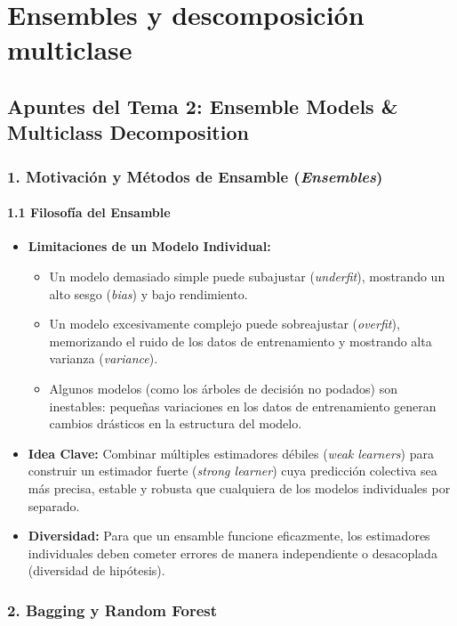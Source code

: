 \chapter{Ensembles y descomposición multiclase}
\section{Apuntes del Tema 2: Ensemble Models \& Multiclass Decomposition}

\subsection{1. Motivación y Métodos de Ensamble (\emph{Ensembles})}

\subsubsection{1.1 Filosofía del Ensamble}

\begin{itemize}
	\item \textbf{Limitaciones de un Modelo Individual:}
	\begin{itemize}
		\item Un modelo demasiado simple puede subajustar (\emph{underfit}), mostrando un alto sesgo (\emph{bias}) y bajo rendimiento.
		\item Un modelo excesivamente complejo puede sobreajustar (\emph{overfit}), memorizando el ruido de los datos de entrenamiento y mostrando alta varianza (\emph{variance}).
		\item Algunos modelos (como los árboles de decisión no podados) son inestables: pequeñas variaciones en los datos de entrenamiento generan cambios drásticos en la estructura del modelo.
	\end{itemize}
	
	\item \textbf{Idea Clave:} Combinar múltiples estimadores débiles (\emph{weak learners}) para construir un estimador fuerte (\emph{strong learner}) cuya predicción colectiva sea más precisa, estable y robusta que cualquiera de los modelos individuales por separado.
	
	\item \textbf{Diversidad:} Para que un ensamble funcione eficazmente, los estimadores individuales deben cometer errores de manera independiente o desacoplada (diversidad de hipótesis).
\end{itemize}

\subsection{2. Bagging y Random Forest}

